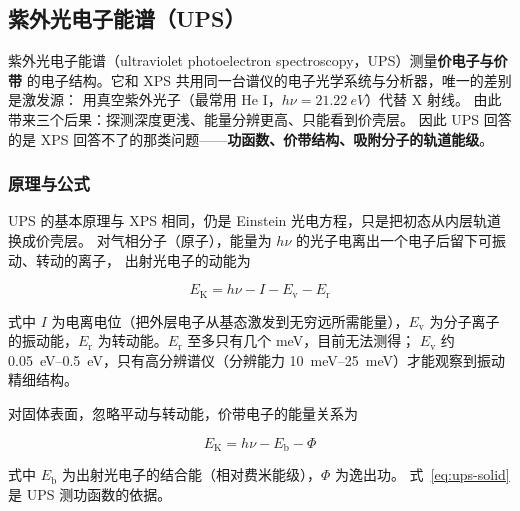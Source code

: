 
\subsection{紫外光电子能谱（UPS）}

\begin{probout}
紫外光电子能谱（ultraviolet photoelectron spectroscopy，UPS）测量\textbf{价电子与价带}
的电子结构。它和 XPS 共用同一台谱仪的电子光学系统与分析器，唯一的差别是激发源：
用真空紫外光子（最常用 He I，$h\nu=\qty{21.22}{eV}$）代替 X 射线。
由此带来三个后果：探测深度更浅、能量分辨更高、只能看到价壳层。
因此 UPS 回答的是 XPS 回答不了的那类问题——\textbf{功函数、价带结构、吸附分子的轨道能级}。
\end{probout}

\subsubsection{原理与公式}

UPS 的基本原理与 XPS 相同，仍是 Einstein 光电方程，只是把初态从内层轨道换成价壳层。
对气相分子（原子），能量为 $h\nu$ 的光子电离出一个电子后留下可振动、转动的离子，
出射光电子的动能为

\begin{equation}\label{eq:ups-gas}
E_{\mathrm{K}}=h\nu-I-E_{\mathrm{v}}-E_{\mathrm{r}}
\end{equation}

式中 $I$ 为电离电位（把外层电子从基态激发到无穷远所需能量），$E_{\mathrm{v}}$ 为分子离子
的振动能，$E_{\mathrm{r}}$ 为转动能。$E_{\mathrm{r}}$ 至多只有几个 meV，目前无法测得；
$E_{\mathrm{v}}$ 约 \qtyrange{0.05}{0.5}{eV}，只有高分辨谱仪（分辨能力
\qtyrange{10}{25}{meV}）才能观察到振动精细结构。

对固体表面，忽略平动与转动能，价带电子的能量关系为

\begin{equation}\label{eq:ups-solid}
E_{\mathrm{K}}=h\nu-E_{\mathrm{b}}-\Phi
\end{equation}

式中 $E_{\mathrm{b}}$ 为出射光电子的结合能（相对费米能级），$\Phi$ 为逸出功。
式~\eqref{eq:ups-solid} 是 UPS 测功函数的依据。

